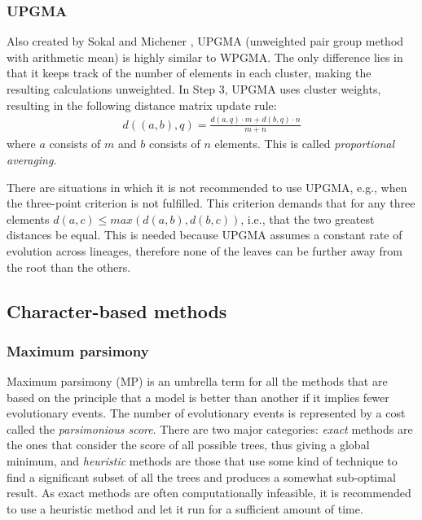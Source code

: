 \documentclass[11pt,twocolumn]{article}
\begin{document}
\subsubsection{UPGMA}

Also created by Sokal and Michener \cite{sokal58}, UPGMA (unweighted pair group method with arithmetic mean) is highly similar to WPGMA. The only difference lies in that it keeps track of the number of elements in each cluster, making the resulting calculations unweighted. In Step 3, UPGMA uses cluster weights, resulting in the following distance matrix update rule:
\begin{align}
d((a, b), q) = \frac{d(a, q) \cdot m + d(b, q) \cdot n}{m + n}
\end{align}
where $a$ consists of $m$ and $b$ consists of $n$ elements. This is called \textit{proportional averaging}.

There are situations in which it is not recommended to use UPGMA, e.g., when the three-point criterion is not fulfilled. This criterion demands that for any three elements $d(a, c) \le max(d(a, b), d(b, c))$, i.e., that the two greatest distances be equal. This is needed because UPGMA assumes a constant rate of evolution across lineages, therefore none of the leaves can be further away from the root than the others.

\subsection{Character-based methods}
\subsubsection{Maximum parsimony}

Maximum parsimony (MP) is an umbrella term for all the methods that are based on the principle that a model is better than another if it implies fewer evolutionary events. The number of evolutionary events is represented by a cost called the \textit{parsimonious score}. There are two major categories: \textit{exact} methods are the ones that consider the score of all possible trees, thus giving a global minimum, and \textit{heuristic} methods are those that use some kind of technique to find a significant subset of all the trees and produces a somewhat sub-optimal result. As exact methods are often computationally infeasible, it is recommended to use a heuristic method and let it run for a sufficient amount of time.
\end{document}
